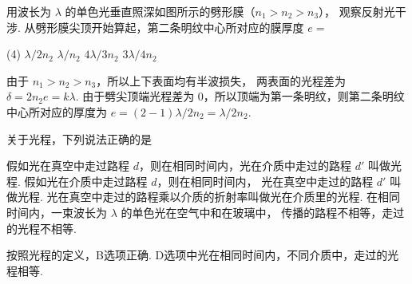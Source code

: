 \begin{textfig}
  \begin{problem}
    用波长为 $\lambda$ 的单色光垂直照深如图所示的劈形膜（$n_1 > n_2 > n_3$），
    观察反射光干涉. 从劈形膜尖顶开始算起，第二条明纹中心所对应的膜厚度 $e =$
    \begin{tasks}(4)
      \task[\true] $\lambda/2n_2$
      \task $\lambda/n_2$
      \task $4\lambda/3n_2$
      \task $3\lambda/4n_2$
    \end{tasks}
  \end{problem}
  \textfigsplit\centering
\end{textfig}
\scratch[4ex]
\begin{solution}
  由于 $n_1 > n_2 > n_3$，所以上下表面均有半波损失，
  两表面的光程差为 $\delta = 2n_2e = k\lambda$.
  由于劈尖顶端光程差为 $0$，所以顶端为第一条明纹，则第二条明纹中心所对应的厚度为
  $e = (2 - 1)\lambda/2n_2 = \lambda/2n_2$.
\end{solution}

\begin{problem}
  关于光程，下列说法正确的是
  \begin{tasks}
    \task 假如光在真空中走过路程 $d$，则在相同时间内，光在介质中走过的路程 $d'$ 叫做光程.
    \task[\true] 假如光在介质中走过路程 $d$，则在相同时间内，
      光在真空中走过的路程 $d'$ 叫做光程.
    \task 光在真空中走过的路程乘以介质的折射率叫做光在介质里的光程.
    \task 在相同时间内，一束波长为 $\lambda$ 的单色光在空气中和在玻璃中，
    传播的路程不相等，走过的光程不相等.
  \end{tasks}
\end{problem}
\scratch[1ex]
\begin{solution}
  按照光程的定义，B选项正确. D选项中光在相同时间内，不同介质中，走过的光程相等.
\end{solution}

